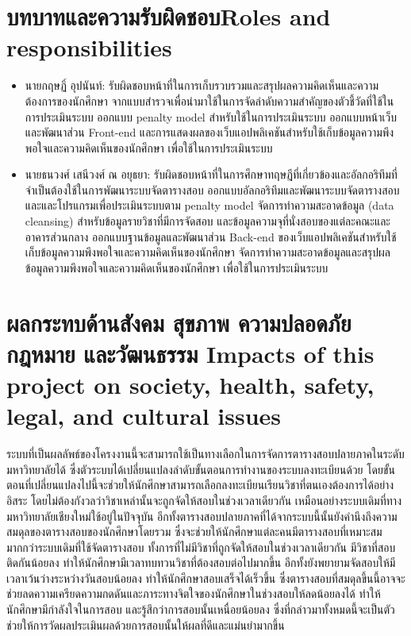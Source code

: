 
\section{\ifcpe บทบาทและความรับผิดชอบ\else Roles and responsibilities\fi}
\begin{itemize}
    \item นายกฤษฏิ์ อุปนันท์: รับผิดชอบหน้าที่ในการเก็บรวบรวมและสรุปผลความคิดเห็นและความต้องการของนักศึกษา
    จากแบบสำรวจเพื่อนำมาใช้ในการจัดลำดับความสำคัญของตัวชี้วัดที่ใช้ในการประเมินระบบ ออกแบบ penalty model สำหรับใช้ในการประเมินระบบ 
    ออกแบบหน้าเว็บและพัฒนาส่วน Front-end และการแสดงผลของเว็บแอปพลิเคชันสำหรับใช้เก็บข้อมูลความพึงพอใจและความคิดเห็นของนักศึกษา เพื่อใช้ในการประเมินระบบ
    \item นายธนวงศ์ เสนีวงศ์ ณ อยุธยา: รับผิดชอบหน้าที่ในการศึกษาทฤษฎีที่เกี่ยวข้องและอัลกอริทึมที่จำเป็นต้องใช้ในการพัฒนาระบบจัดตารางสอบ 
    ออกแบบอัลกอริทึมและพัฒนาระบบจัดตารางสอบและและโปรแกรมเพื่อประเมินระบบตาม penalty model 
    จัดการทำความสะอาดข้อมูล (data cleansing) สำหรับข้อมูลรายวิชาที่มีการจัดสอบ และข้อมูลความจุที่นั่งสอบของแต่ละคณะและอาคารส่วนกลาง
    ออกแบบฐานข้อมูลและพัฒนาส่วน Back-end ของเว็บแอปพลิเคชันสำหรับใช้เก็บข้อมูลความพึงพอใจและความคิดเห็นของนักศึกษา
    จัดการทำความสะอาดข้อมูลและสรุปผล ข้อมูลความพึงพอใจและความคิดเห็นของนักศึกษา เพื่อใช้ในการประเมินระบบ
\end{itemize}

\section{\ifcpe%
ผลกระทบด้านสังคม สุขภาพ ความปลอดภัย กฎหมาย และวัฒนธรรม
\else%
Impacts of this project on society, health, safety, legal, and cultural issues
\fi}

ระบบที่เป็นผลลัพธ์ของโครงงานนี้จะสามารถใช้เป็นทางเลือกในการจัดการตารางสอบปลายภาคในระดับมหาวิทยาลัยได้
ซึ่งตัวระบบได้เปลี่ยนแปลงลำดับขั้นตอนการทำงานของระบบลงทะเบียนด้วย โดยขั้นตอนที่เปลี่ยนแปลงไปนี้จะช่วยให้นักศึกษาสามารถเลือกลงทะเบียนเรียนวิชาที่ตนเองต้องการได้อย่างอิสระ 
โดยไม่ต้องกังวลว่าวิชาเหล่านั้นจะถูกจัดให้สอบในช่วงเวลาเดียวกัน เหมือนอย่างระบบเดิมที่ทางมหาวิทยาลัยเชียงใหม่ใช้อยู่ในปัจจุบัน
อีกทั้งตารางสอบปลายภาคที่ได้จากระบบนี้นั้นยังคำนึงถึงความสมดุลของตารางสอบของนักศึกษาโดยรวม ซึ่งจะช่วยให้นักศึกษาแต่ละคนมีตารางสอบที่เหมาะสมมากกว่าระบบเดิมที่ใช้จัดตารางสอบ
ทั้งการที่ไม่มีวิชาที่ถูกจัดให้สอบในช่วงเวลาเดียวกัน มีวิชาที่สอบติดกันน้อยลง ทำให้นักศึกษามีเวลาทบทวนวิชาที่ต้องสอบต่อไปมากขึ้น อีกทั้งยังพยายามจัดสอบให้มีเวลาเว้นว่างระหว่างวันสอบน้อยลง
ทำให้นักศึกษาสอบเสร็จได้เร็วขึ้น ซึ่งตารางสอบที่สมดุลขึ้นนี้อาจจะช่วยลดความเครียดความกดดันและภาระทางจิตใจของนักศึกษาในช่วงสอบให้ลดน้อยลงได้ ทำให้นักศึกษามีกำลังใจในการสอบ และรู้สึกว่าการสอบนั้นเหนื่อยน้อยลง
ซึ่งที่กล่าวมาทั้งหมดนี้จะเป็นตัวช่วยให้การวัดผลประเมินผลด้วยการสอบนั้นให้ผลที่ดีและแม่นยำมากขึ้น


